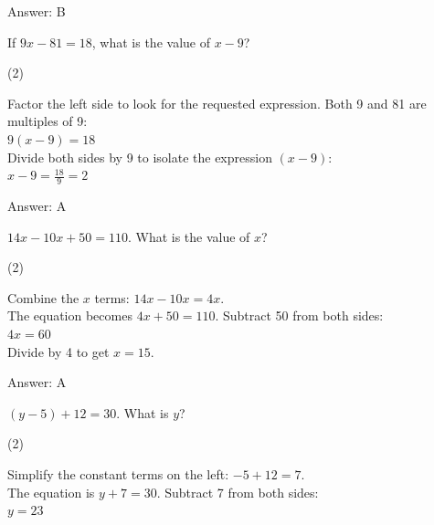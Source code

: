 \documentclass[11pt,paper=a4,answers]{exam}
\begin{document}
\begin{questions}
\begin{solution}
\vspace{20pt}
Answer: \colorbox{yellow!100}{B}
\end{solution}

\question
If $9x - 81 = 18$, what is the value of $x - 9$?
\begin{tasks}(2)
\end{tasks}

\begin{solution}
Factor the left side to look for the requested expression. Both 9 and 81 are multiples of 9:
\\[10pt]
$9(x - 9) = 18$ 
\\[10pt]
Divide both sides by 9 to isolate the expression $(x - 9)$:
\\[10pt]
$x - 9 = \frac{18}{9} = 2$

\vspace{20pt}
Answer: \colorbox{yellow!100}{A}
\end{solution}

\question
$14x - 10x + 50 = 110$. What is the value of $x$?
\begin{tasks}(2)
\end{tasks}

\begin{solution}
Combine the $x$ terms: $14x - 10x = 4x$. 
\\[10pt]
The equation becomes $4x + 50 = 110$. Subtract 50 from both sides:
\\[10pt]
$4x = 60$ 
\\[10pt]
Divide by 4 to get $x = 15$.

\vspace{20pt}
Answer: \colorbox{yellow!100}{A}
\end{solution}

\question
$(y - 5) + 12 = 30$. What is $y$?
\begin{tasks}(2)
\end{tasks}

\begin{solution}
Simplify the constant terms on the left: $-5 + 12 = 7$. 
\\[10pt]
The equation is $y + 7 = 30$. Subtract 7 from both sides:
\\[10pt]
$y = 23$


\end{solution}
\end{questions}
\end{document}
